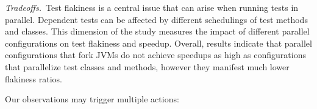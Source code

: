 
\vspace{1ex}\noindent\emph{Tradeoffs.}~Test flakiness is a central
issue that can arise when running tests in parallel.  Dependent tests
can be affected by different schedulings of test methods and classes.
This dimension of the study measures the impact of different parallel
configurations on test flakiness and speedup.  Overall, results
indicate that parallel configurations that fork JVMs do not achieve
speedups as high as configurations that parallelize test classes and
methods, however they manifest much lower flakiness ratios.

Our observations may trigger multiple actions:


